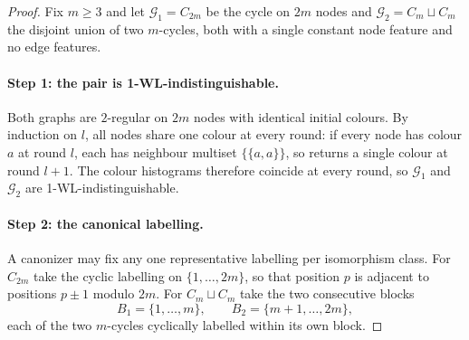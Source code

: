 \begin{proof}
Fix $m\ge 3$ and let $\mathcal{G}_1=C_{2m}$ be the cycle on $2m$ nodes and
$\mathcal{G}_2=C_m\sqcup C_m$ the disjoint union of two $m$-cycles, both with a
single constant node feature and no edge features.

\paragraph{Step 1: the pair is 1-WL-indistinguishable.}
Both graphs are $2$-regular on $2m$ nodes with identical initial colours. By
induction on $l$, all nodes share one colour at every round: if every node has
colour $a$ at round $l$, each has neighbour multiset $\{\!\{a,a\}\!\}$, so
 returns a single colour at round $l+1$. The colour
histograms therefore coincide at every round, so $\mathcal{G}_1$ and
$\mathcal{G}_2$ are 1-WL-indistinguishable.

\paragraph{Step 2: the canonical labelling.}
A canonizer may fix any one representative labelling per isomorphism class. For
$C_{2m}$ take the cyclic labelling on $\{1,\dots,2m\}$, so that position $p$ is
adjacent to positions $p\pm1$ modulo $2m$. For $C_m\sqcup C_m$ take the two
consecutive blocks
\begin{equation*}
  B_1=\{1,\dots,m\},\qquad B_2=\{m+1,\dots,2m\},
\end{equation*}
each of the two $m$-cycles cyclically labelled within its own block.


\end{proof}
